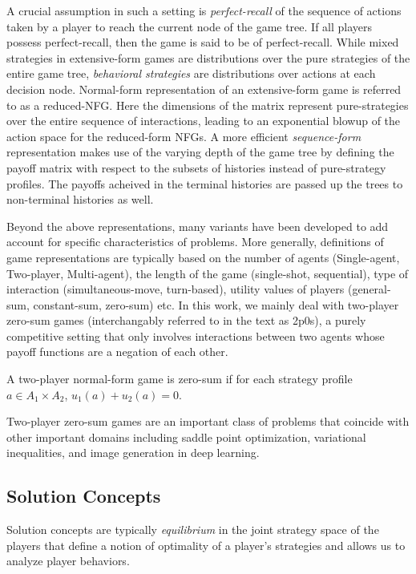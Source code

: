 A crucial assumption in such a setting is \textit{perfect-recall} of the sequence of actions taken
by a player to reach the current node of the game tree.
If all players possess perfect-recall, then the game is said to be of perfect-recall.
While mixed strategies in extensive-form games are distributions over the pure strategies of the
entire game tree, \textit{behavioral strategies} are distributions over actions at each decision
node.
Normal-form representation of an extensive-form game is referred to as a reduced-NFG.
Here the dimensions of the matrix represent pure-strategies over the entire sequence of
interactions, leading to an exponential blowup of the action space for the reduced-form NFGs.
A more efficient \textit{sequence-form} representation makes use of the varying depth of the game
tree by defining the payoff matrix with respect to the subsets of histories instead of
pure-strategy profiles.
The payoffs acheived in the terminal histories are passed up the trees to non-terminal histories as
well.

Beyond the above representations, many variants have been developed to add account for specific
characteristics of problems.
More generally, definitions of game representations are typically based on the number of agents
(Single-agent, Two-player, Multi-agent), the length of the game (single-shot, sequential), type of
interaction (simultaneous-move, turn-based), utility values of players (general-sum, constant-sum,
zero-sum) etc. In this work, we mainly deal with two-player zero-sum games (interchangably referred
to in the text as 2p0s), a purely competitive setting that only involves interactions between two
agents whose payoff functions are a negation of each other.
\begin{definition}
	A two-player normal-form game is zero-sum if for each strategy profile $a \in A_1 \times A_2$,
	$u_1(a) + u_2(a) = 0$.
\end{definition}
Two-player zero-sum games are an important class of problems that coincide with other important
domains including saddle point optimization, variational inequalities, and image generation in deep
learning.

\subsection{Solution Concepts}
Solution concepts are typically \textit{equilibrium} in the joint strategy space of the players
that define a notion of optimality of a player's strategies and allows us to analyze player
behaviors.


